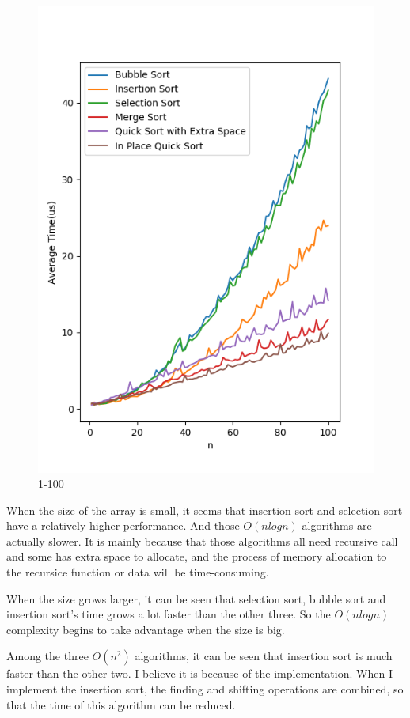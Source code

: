 \documentclass{article}
\begin{document}
\begin{figure}[htbp]
\begin{minipage}[t]{0.35\textwidth}
        \includegraphics[width=\textwidth]{zero_hundred.png}
        \caption{1-100}
    \end{minipage}
\end{figure}

When the size of the array is small, it seems that insertion sort and selection sort have a relatively higher performance. And those $O(nlogn)$ algorithms are actually slower. It is mainly because that those algorithms all need recursive call and some has extra space to allocate, and the process of memory allocation to the recursice function or data will be time-consuming. 

When the size grows larger, it can be seen that selection sort, bubble sort and insertion sort's time grows a lot faster than the other three. So the $O(nlogn)$ complexity begins to take advantage when the size is big.

Among the three $O(n^2)$ algorithms, it can be seen that insertion sort is much faster than the other two. I believe it is because of the implementation. When I implement the insertion sort, the finding and shifting operations are combined, so that the time of this algorithm can be reduced.
\end{document}
